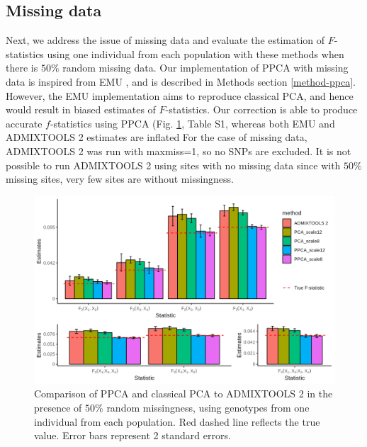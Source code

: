 \documentclass[12pt]{article}
\begin{document}
\subsection{Missing data}
Next, we address the issue of missing data and evaluate the estimation of $F$-statistics using one individual from each population with these methods when there is $50\%$ random missing data. Our implementation of PPCA with missing data is inspired from EMU \citep{meisner_large-scale_2021}, and is described in Methods section \ref{method-ppca}. However, the EMU implementation aims to reproduce classical PCA, and hence would result in biased estimates of $F$-statistics. Our correction is able to produce accurate $f$-statistics using PPCA (Fig. \ref{fig:comparison-adm}, Table S1, whereas both EMU and ADMIXTOOLS 2 estimates are inflated For the case of missing data, ADMIXTOOLS 2 was run with maxmiss=1, so no SNPs are excluded. It is not possible to run ADMIXTOOLS 2 using sites with no missing data since with $50\%$ missing sites, very few sites are without missingness. 

\begin{figure}[ht!]
    \includegraphics[width=16.5cm]{Images/Figures/mu0.05_plot_all_1ind_missing.png}
    \centering
    \caption{Comparison of PPCA and classical PCA to ADMIXTOOLS 2 in the presence of $50\%$ random missingness, using genotypes from one individual from each population. Red dashed line reflects the true value. Error bars represent 2 standard errors.}
    \label{fig:comparison-adm}
\end{figure}
\end{document}

